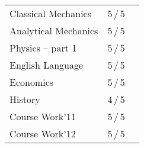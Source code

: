 \documentclass[a4paper,10pt]{article}
\begin{document}
\begin{center}
\begin{tabular}{lcc}
Classical Mechanics &5\,/\,5 \\
Analytical Mechanics &5\,/\,5 \\
Physics -- part 1 &5\,/\,5\\

English Language &5\,/\,5 \\
Economics &5\,/\,5 \\
History &4\,/\,5 \\

Course Work'11 & 5\,/\,5 \\
Course Work'12 & 5\,/\,5 \\

\end{tabular}
\end{center}


\end{document}
